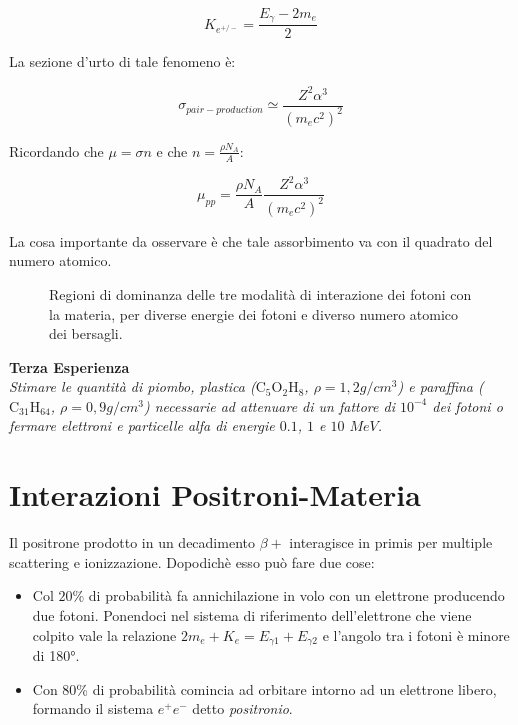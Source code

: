 \begin{equation}
K_{e^{+/-}}=\frac{E_{\gamma}-2m_e}{2}
\end{equation}

La sezione d'urto di tale fenomeno è:

\begin{equation}
\sigma_{pair-production}\simeq\frac{Z^2\alpha^3}{(m_ec^2)^2}
\end{equation}

Ricordando che $\mu=\sigma n$ e che $n=\frac{\rho N_A}{A}$:

\begin{equation}
\mu_{pp}=\frac{\rho N_A}{A}\frac{Z^2\alpha^3}{(m_ec^2)^2}
\end{equation}

La cosa importante da osservare è che tale assorbimento va con il quadrato del numero atomico.\\

\begin{figure} []
\centering
		\caption{Regioni di dominanza delle tre modalità di interazione dei fotoni con la materia, per diverse energie dei fotoni e diverso numero atomico dei bersagli.}
         \label{crosssection}
\end{figure}



\textbf{Terza Esperienza}\\

\emph{Stimare le quantità di piombo, plastica ($\text{C}_5\text{O}_2\text{H}_8$, $\rho=1,2 g/cm^3$) e paraffina ($\text{C}_{31}\text{H}_{64}$, $\rho=0,9 g/cm^3$) necessarie ad attenuare di un fattore di $10^{-4}$ dei fotoni o fermare elettroni e particelle alfa di energie $0.1$, $1$ e $10$ $MeV$.}

\section{Interazioni Positroni-Materia}

Il positrone prodotto in un decadimento $\beta+$ interagisce in primis per multiple scattering e ionizzazione. Dopodichè esso può fare due cose:

\begin{itemize}
\item Col $20\%$ di probabilità fa annichilazione in volo con un elettrone producendo due fotoni. Ponendoci nel sistema di riferimento dell'elettrone che viene colpito vale la relazione $2m_e+K_e=E_{\gamma1}+E_{\gamma2}$ e l'angolo tra i fotoni è minore di \ang{180}.
\item Con 80\% di probabilità comincia ad orbitare intorno ad un elettrone libero, formando il sistema $e^+e^-$ detto \emph{positronio}.
\end{itemize}

